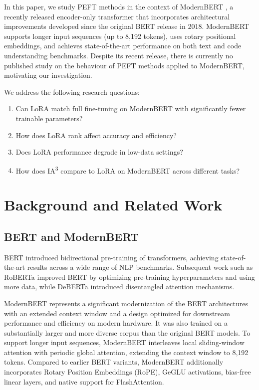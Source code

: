 \documentclass[11pt]{article}
\begin{document}
In this paper, we study PEFT methods in the context of ModernBERT
\cite{warner2024modernbert}, a recently released encoder-only transformer
that incorporates architectural improvements developed since the original
BERT release in 2018. ModernBERT supports longer input sequences (up to
8,192 tokens), uses rotary positional embeddings, and achieves state-of-the-art
performance on both text and code understanding benchmarks. Despite its
recent release, there is currently no published study on the behaviour
of PEFT methods applied to ModernBERT, motivating our investigation.

We address the following research questions:
\begin{enumerate}
    \item Can LoRA match full fine-tuning on ModernBERT with significantly
          fewer trainable parameters?
    \item How does LoRA rank affect accuracy and efficiency?
    \item Does LoRA performance degrade in low-data settings?
    \item How does IA\textsuperscript{3} compare to LoRA on ModernBERT
          across different tasks?
\end{enumerate}

\section{Background and Related Work}

\subsection{BERT and ModernBERT}

BERT \cite{devlin2019bert} introduced bidirectional pre-training of
transformers, achieving state-of-the-art results across a wide range of
NLP benchmarks. Subsequent work such as RoBERTa \cite{liu2019roberta}
improved BERT by optimizing pre-training hyperparameters and using more
data, while DeBERTa \cite{he2021deberta} introduced disentangled
attention mechanisms.

ModernBERT \cite{warner2024modernbert} represents a
significant modernization of the BERT architectures with an extended context window and a design optimized for downstream performance and efficiency on modern hardware. It was also trained on a substantially larger and more diverse corpus than the original BERT models. To support longer input sequences, ModernBERT interleaves local sliding-window attention with periodic global attention, extending the context window to 8,192 tokens. Compared to earlier BERT variants, ModernBERT additionally incorporates Rotary Position Embeddings (RoPE), GeGLU activations, bias-free linear layers, and native support for FlashAttention. 
\end{document}
